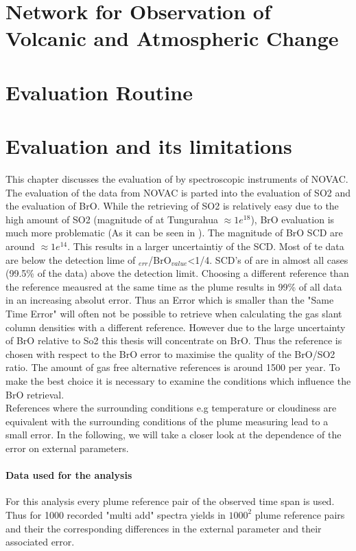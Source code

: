 \documentclass  [
  paper    = a4,
  BCOR     = 10mm,
  twoside,
  fontsize = 12pt,
  fleqn,
  toc      = bibnumbered,
  toc      = listofnumbered,
  numbers  = noendperiod,
  headings = normal,
  listof   = leveldown,
  version  = 3.03
]                                       {scrreprt}
\begin{document}
	
	\chapter{Network for Observation of Volcanic and Atmospheric Change \label{NOVAC}}
	
	
	\chapter{Evaluation Routine}
	
	\chapter{  Evaluation and its limitations}
	This chapter discusses the evaluation of   by spectroscopic instruments of NOVAC.\\
	The evaluation of the data from NOVAC is parted into the evaluation of SO2 and the evaluation of BrO. While the retrieving of SO2 is relatively easy due to the high amount of SO2  (magnitude of  at Tungurahua $\approx 1e^{18}$), BrO evaluation is much more problematic (As it can be seen in ). The magnitude of BrO SCD are around $\approx 1e^{14}$. 
	This results in a larger uncertaintiy of the   SCD. Most of te   data are below the detection lime of $_{err}$/BrO$_{value}$<1/4. SCD's of   are in almost all cases (99.5\% of the data) above the detection limit. 
	Choosing a different reference than the reference meausred at the same time as the plume results in 99\% of all data in an increasing absolut error. 
	Thus an  Error which is smaller than the "Same Time Error" will often not be possible to retrieve when calculating the gas slant column densities with a different reference. However due to the large uncertainty of BrO relative to So2 this thesis will concentrate on BrO. Thus the reference is chosen with respect to the BrO error to maximise the quality of the BrO/SO2 ratio. The amount of gas free alternative references is around 1500 per year. To make the best choice it is necessary to examine the conditions which influence the BrO retrieval.
	\\
	References where the surrounding conditions e.g temperature or cloudiness are equivalent with the surrounding conditions of the  plume measuring lead to a small error.
	In the following, we will take a closer look at the dependence of the  error on external parameters. 
	\subsubsection*{Data used for the analysis}
	For this analysis every plume reference pair of the observed time span is used. Thus for 1000 recorded "multi add" spectra yields in $1000^2$ plume reference pairs and their the corresponding differences in the external parameter and their associated  error.
\end{document}
